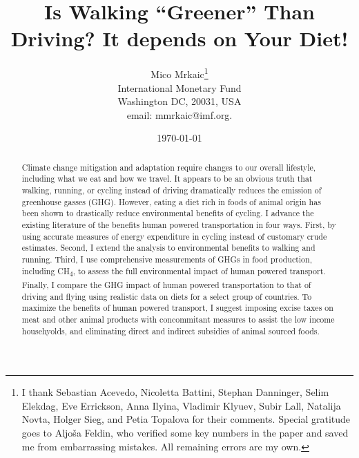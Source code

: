 \documentclass{article}[12pt,letterpaper]
\begin{document}
\newcommand{\cadi}{CO\textsubscript{2}\xspace}
\newcommand{\methane}{CH\textsubscript{4}\xspace}

\title{Is Walking ``Greener'' Than Driving? It depends on Your Diet!}
\date{\today}
\author{Mico Mrkaic\thanks{I thank Sebastian Acevedo, Nicoletta Battini, Stephan Danninger, Selim Elekdag, Eve Errickson, Anna Ilyina, Vladimir Klyuev, Subir Lall, Natalija Novta, Holger Sieg, and Petia Topalova for their comments. Special gratitude goes to Aljo\v{s}a Feldin, who verified some key numbers in the paper and saved me from embarrassing mistakes. All remaining errors are my own.}
\\International Monetary Fund\\Washington DC, 20031, USA\\email: mmrkaic@imf.org.}

\maketitle
\begin{abstract}\noindent Climate change mitigation and adaptation require changes to our overall lifestyle, including what we eat and how we travel. It appears to be an obvious truth that walking, running, or cycling instead of driving dramatically reduces the emission of greenhouse gasses (GHG). However, eating a diet rich in foods of animal origin has been shown to drastically reduce environmental benefits of cycling. I advance the existing literature of the benefits human powered transportation in four ways. First, by using accurate measures of energy expenditure in cycling instead of customary crude estimates. Second, I extend the analysis to environmental benefits to walking and running. Third, I use comprehensive measurements of GHGs in food production, including \methane, to assess the full environmental impact of human powered transport. Finally, I compare the GHG impact of human powered transportation to that of driving and flying using realistic data on diets for a select group of countries. To maximize the benefits of human powered transport, I suggest imposing excise taxes on meat and other animal products with concommitant measures to assist the low income househyolds, and eliminating direct and indirect subsidies of animal sourced foods.
\end{abstract}

\newpage
{}
\end{document}
